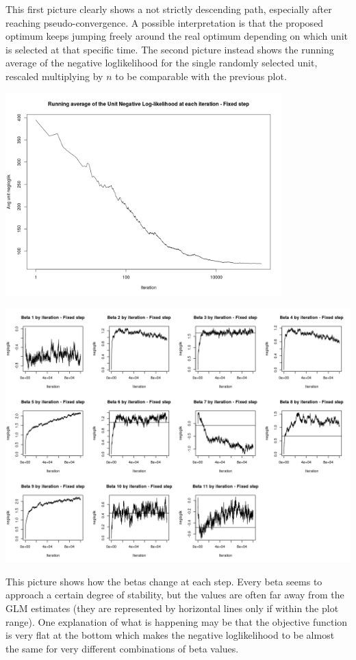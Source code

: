\documentclass{article}
\begin{document}
This first picture clearly shows a not strictly descending path, especially after reaching pseudo-convergence. A possible interpretation is that the proposed optimum keeps jumping freely around the real optimum depending on which unit is selected at that specific time. The second picture instead shows the running average of the negative loglikelihood for the single randomly selected unit, rescaled multiplying by $n$ to be comparable with the previous plot. 

\begin{center}
\includegraphics[width=0.8\textwidth]{Rplot_run_avg_unit_negloglik.png}
\end{center}


\includegraphics[width=\textwidth]{Rplot_beta_traces.png}

This picture shows how the betas change at each step. Every beta seems to approach a certain degree of stability, but the values are often far away from the GLM estimates (they are represented by horizontal lines only if within the plot range). One explanation of what is happening may be that the objective function is very flat at the bottom which makes the negative loglikelihood to be almost the same for very different combinations of beta values.
\end{document}
